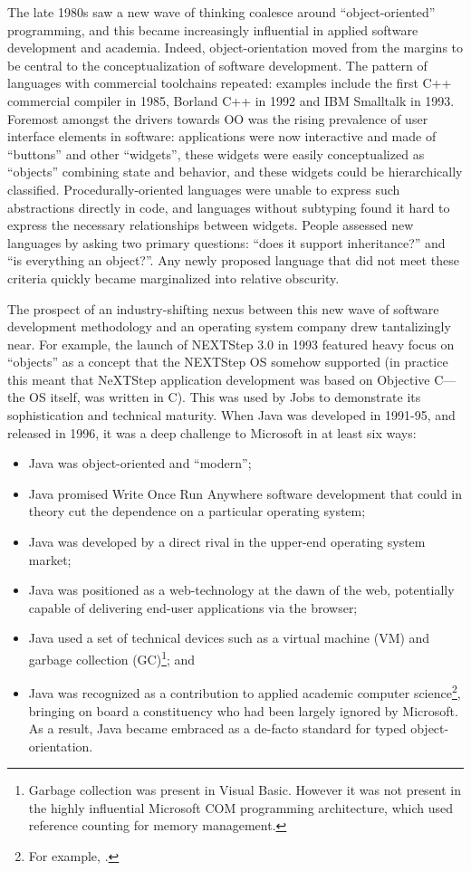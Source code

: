 \documentclass[acmsmall,screen]{acmart}
\begin{document}
The late 1980s saw a new wave of thinking coalesce around “object-oriented” programming, and this became increasingly
influential in applied software development and academia.  Indeed, object-orientation moved from the margins to be central
to the conceptualization of software development.  The pattern of languages with commercial toolchains repeated:
examples include the first C++ commercial compiler in 1985, Borland C++ in 1992 and IBM Smalltalk in 1993.   Foremost
amongst the drivers towards OO was the rising prevalence of user interface elements in software: applications were
now interactive and made of “buttons” and other “widgets”, these widgets were easily conceptualized as “objects” combining
state and behavior, and these widgets could be hierarchically classified. Procedurally-oriented languages were unable
to express such abstractions directly in code, and languages without subtyping found it hard to express the necessary
relationships between widgets. People assessed new languages by asking two primary questions: “does it support inheritance?”
and “is everything an object?”.  Any newly proposed language that did not meet these criteria quickly became marginalized into relative obscurity. 

The prospect of an industry-shifting nexus between this new wave of software development methodology and an
operating system company drew tantalizingly near. For example, the launch of NEXTStep 3.0 in 1993 featured heavy
focus on “objects” as a concept that the NEXTStep OS somehow supported (in practice this meant that NeXTStep application
development was based on Objective C---the OS itself, was written in C). This was used by Jobs to demonstrate its
sophistication and technical maturity. When Java was developed in 1991-95, and released in 1996, it was a deep challenge to Microsoft in at least six ways: 
\begin{itemize}
\item Java was object-oriented and “modern”;
\item Java promised Write Once Run Anywhere software development that could in theory cut the dependence on a particular operating system; 
\item Java was developed by a direct rival in the upper-end operating system market; 
\item Java was positioned as a web-technology at the dawn of the web, potentially capable of delivering end-user applications via the browser;
\item Java used a set of technical devices such as a virtual machine (VM) and garbage collection (GC)\footnote{Garbage collection was present in Visual Basic. However it was not present in the highly influential Microsoft COM programming architecture, which used reference counting for memory management.};  and 
\item Java was recognized as a contribution to applied academic computer science\footnote{For example, \citep{AlvesFoss1999}.}, bringing on board a constituency who had been largely ignored by Microsoft. As a result, Java became embraced as a de-facto standard for typed object-orientation.
\end{itemize}
\end{document}
